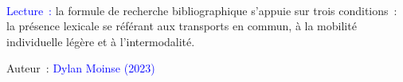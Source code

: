 \begin{table}[h!]
\begin{flushleft}
{        \\
        \textcolor{blue}{Lecture~:} la formule de recherche bibliographique s'appuie sur trois conditions~: la présence lexicale se référant aux transports en commun, à la mobilité individuelle légère et à l'intermodalité.
        }\end{flushleft}
        \begin{flushright}\scriptsize{
        Auteur~: \textcolor{blue}{Dylan Moinse (2023)}
        }\end{flushright}
        \end{table}